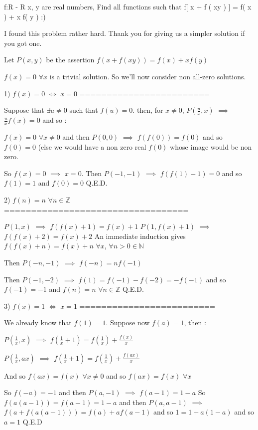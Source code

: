 \begin{solution}
	\begin{tcolorbox}f:R - R\/      x, y are real numbers, Find all functions such that 
f[ x + f ( xy ) ] = f( x ) + x f( y ) :)\end{tcolorbox}

I found this problem rather hard. Thank you for giving us a simpler solution if you got one.

Let $ P(x,y)$ be the assertion $ f(x+f(xy))=f(x)+xf(y)$

$ f(x)=0$ $ \forall x$ is a trivial solution. So we'll now consider non all-zero solutions.

1) $ f(x)=0$ $ \iff$ $ x=0$
========================

Suppose that $ \exists u\neq 0$ such that $ f(u)=0$. then, for $ x\neq 0$, $ P(\frac ux,x)$ $ \implies$ $ \frac uxf(x)=0$ and so :

$ f(x)=0$ $ \forall x\neq 0$ and then $ P(0,0)$ $ \implies$ $ f(f(0))=f(0)$ and so $ f(0)=0$ (else we would have a non zero real $ f(0)$ whose image would be non zero.

So $ f(x)=0$ $ \implies$ $ x=0$.
Then $ P(-1,-1)$ $ \implies$ $ f(f(1)-1)=0$ and so $ f(1)=1$ and $ f(0)=0$
Q.E.D.

2) $ f(n)=n$ $ \forall n\in\mathbb Z$
==================================

$ P(1,x)$ $ \implies$ $ f(f(x)+1)=f(x)+1$
$ P(1,f(x)+1)$ $ \implies$ $ f(f(x)+2)=f(x)+2$
An immediate induction gives $ f(f(x)+n)=f(x)+n$ $ \forall x$, $ \forall n>0\in\mathbb N$

Then $ P(-n,-1)$ $ \implies$ $ f(-n)=nf(-1)$

Then $ P(-1,-2)$ $ \implies$ $ f(1)=f(-1)-f(-2)=-f(-1)$ and so $ f(-1)=-1$ and $ f(n)=n$ $ \forall n\in\mathbb Z$
Q.E.D.

3) $ f(x)=1$ $ \iff$ $ x=1$
=========================

We already know that $ f(1)=1$. Suppose now $ f(a)=1$, then : 

$ P(\frac 1x,x)$ $ \implies$ $ f(\frac 1x+1)=f(\frac 1x)+\frac{f(x)}x$

$ P(\frac 1x,ax)$ $ \implies$ $ f(\frac 1x+1)=f(\frac 1x)+\frac{f(ax)}x$

And so $ f(ax)=f(x)$ $ \forall x\neq 0$ and so $ f(ax)=f(x)$ $ \forall x$

So $ f(-a)=-1$ and then $ P(a,-1)$ $ \implies$ $ f(a-1)=1-a$
So $ f(a(a-1))=f(a-1)=1-a$ and then $ P(a,a-1)$ $ \implies$ $ f(a+f(a(a-1)))=f(a)+af(a-1)$ and so $ 1=1+a(1-a)$ and so $ a=1$
Q.E.D


\end{solution}
